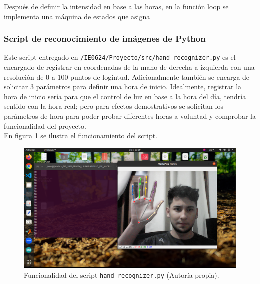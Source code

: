 Después de definir la intensidad en base a las horas, en la función loop se implementa una máquina de estados que asigna




\subsubsection{Script de reconocimiento de imágenes de Python}
Este script entregado en \texttt{/IE0624/Proyecto/src/hand\_recognizer.py} es el encargado de registrar en coordenadas  de la mano de derecha a izquierda con una resolución de 0 a 100 puntos de logintud. Adicionalmente también se encarga de solicitar 3 parámetros para definir una hora de inicio. Idealmente, registrar la hora de inicio sería para que el control de luz en base a la hora del día, tendría sentido con la hora real; pero para efectos demostrativos se solicitan los parámetros de hora para poder probar diferentes horas a voluntad y comprobar la funcionalidad del proyecto.\\
En figura \ref{mano} se ilustra el funcionamiento del script.
\begin{figure}[H]
\centering
\includegraphics[scale=0.5]{./images/mano.png} 
\caption{Funcionalidad del script \texttt{hand\_recognizer.py} (Autoría propia).}
\label{mano}
\end{figure}

